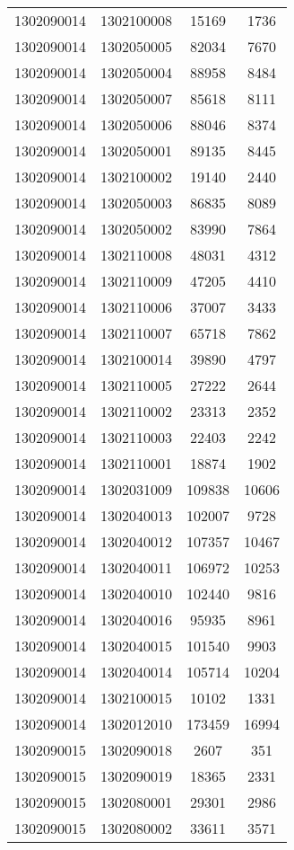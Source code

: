 \begin{longtable}[h]{llcc}
		1302090014 & 1302100008 & 15169 & 1736\\
		1302090014 & 1302050005 & 82034 & 7670\\
		1302090014 & 1302050004 & 88958 & 8484\\
		1302090014 & 1302050007 & 85618 & 8111\\
		1302090014 & 1302050006 & 88046 & 8374\\
		1302090014 & 1302050001 & 89135 & 8445\\
		1302090014 & 1302100002 & 19140 & 2440\\
		1302090014 & 1302050003 & 86835 & 8089\\
		1302090014 & 1302050002 & 83990 & 7864\\
		1302090014 & 1302110008 & 48031 & 4312\\
		1302090014 & 1302110009 & 47205 & 4410\\
		1302090014 & 1302110006 & 37007 & 3433\\
		1302090014 & 1302110007 & 65718 & 7862\\
		1302090014 & 1302100014 & 39890 & 4797\\
		1302090014 & 1302110005 & 27222 & 2644\\
		1302090014 & 1302110002 & 23313 & 2352\\
		1302090014 & 1302110003 & 22403 & 2242\\
		1302090014 & 1302110001 & 18874 & 1902\\
		1302090014 & 1302031009 & 109838 & 10606\\
		1302090014 & 1302040013 & 102007 & 9728\\
		1302090014 & 1302040012 & 107357 & 10467\\
		1302090014 & 1302040011 & 106972 & 10253\\
		1302090014 & 1302040010 & 102440 & 9816\\
		1302090014 & 1302040016 & 95935 & 8961\\
		1302090014 & 1302040015 & 101540 & 9903\\
		1302090014 & 1302040014 & 105714 & 10204\\
		1302090014 & 1302100015 & 10102 & 1331\\
		1302090014 & 1302012010 & 173459 & 16994\\
		1302090015 & 1302090018 & 2607 & 351\\
		1302090015 & 1302090019 & 18365 & 2331\\
		1302090015 & 1302080001 & 29301 & 2986\\
		1302090015 & 1302080002 & 33611 & 3571\\

\end{longtable}
